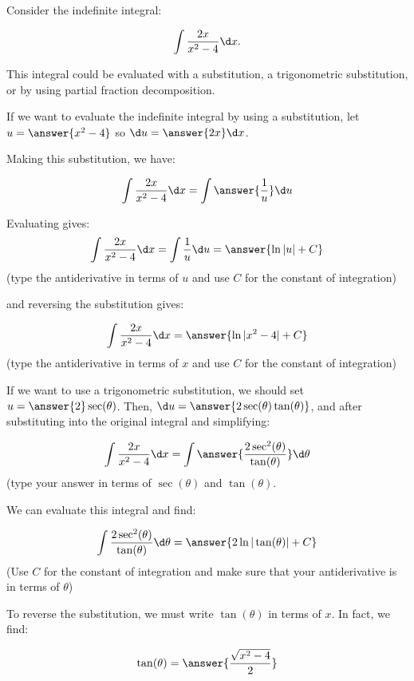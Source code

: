 \documentclass{ximera}
\author{Jim Talamo}
\begin{document}
\begin{exercise}
Consider the indefinite integral: 

\[
\int \frac{2x}{x^2-4} \d x.
\]

This integral could be evaluated with a substitution, a trigonometric substitution, or by using partial fraction decomposition.

If we want to evaluate the indefinite integral by using a substitution, let $u= \answer{x^2-4}$ so $\d u = \answer{2x} \d x$.

\begin{exercise}
Making this substitution, we have:

\[
\int \frac{2x}{x^2-4} \d x = \int \answer{\frac{1}{u}} \d u
\]
\begin{exercise}
Evaluating gives:
\[
\int \frac{2x}{x^2-4} \d x = \int\frac{1}{u} \d u = \answer{\ln|u|+C}
\]
(type the antiderivative in terms of $u$ and use $C$ for the constant of integration)

and reversing the substitution gives:

\[
\int \frac{2x}{x^2-4} \d x = \answer{\ln|x^2-4|+C}
\]
(type the antiderivative in terms of $x$ and use $C$ for the constant of integration)
\end{exercise}
\end{exercise}
\begin{exercise}
If we want to use a trigonometric substitution, we should set $u=\answer{2} \sec(\theta)$.  Then, $\d u = \answer{2 \sec(\theta)\tan(\theta)}$, and after substituting into the original integral and simplifying:

\[
\int \frac{2x}{x^2-4} \d x = \int \answer{\frac{2 \sec^2(\theta)}{\tan(\theta)}} \d \theta
\]
(type your answer in terms of $\sec(\theta)$ and $\tan(\theta)$.

\begin{exercise}
We can evaluate this integral and find:

\[
 \int \frac{2 \sec^2(\theta)}{\tan(\theta)} \d \theta = \answer{2 \ln|\tan(\theta)|+C}
\]
(Use $C$ for the constant of integration and make sure that your antiderivative is in terms of $\theta$)

\begin{exercise}

To reverse the substitution, we must write $\tan(\theta)$ in terms of $x$.  In fact, we find:

\[
\tan(\theta) = \answer{\frac{\sqrt{x^2-4}}{2}}
\]


\end{exercise}
\end{exercise}
\end{exercise}
\end{exercise}
\end{document}
